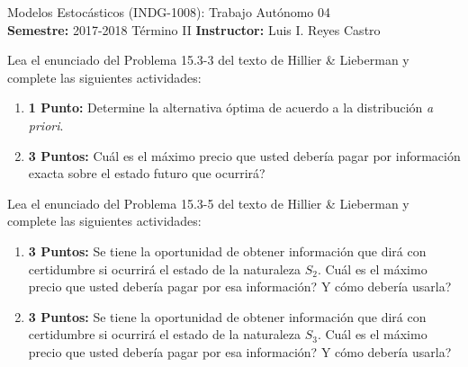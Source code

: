 \documentclass[ a4paper, twoside, 11pt]{article}
\newcommand{\numero}{04}
\begin{document}
\allowdisplaybreaks



\begin{center}
\Large Modelos Estoc\'asticos (INDG-1008): Trabajo Aut\'onomo \numero \\[1ex]
\small \textbf{Semestre:} 2017-2018 T\'ermino II \qquad
\textbf{Instructor:} Luis I. Reyes Castro
\end{center}
\fullskip

%
\halfskip

\begin{problem}
\label{prob:H&L_P15_3_3} Lea el enunciado del Problema 15.3-3 del texto de Hillier \& Lieberman y complete las siguientes actividades: 
\begin{enumerate}[label=\textbf{\alph*)}]
\item \textbf{1 Punto:} Determine la alternativa \'optima de acuerdo a la distribuci\'on \emph{a priori}. 
\item \textbf{3 Puntos:} Cu\'al es el m\'aximo precio que usted deber\'ia pagar por informaci\'on exacta sobre el estado futuro que ocurrir\'a?
\end{enumerate}

\end{problem}
\fullskip

\begin{problem}
\label{prob:H&L_P15_3_5} Lea el enunciado del Problema 15.3-5 del texto de Hillier \& Lieberman y complete las siguientes actividades: 
\begin{enumerate}[label=\textbf{\alph*)}]
\item \textbf{3 Puntos:} Se tiene la oportunidad de obtener informaci\'on que dir\'a con certidumbre si ocurrir\'a el estado de la naturaleza $S_2$. Cu\'al es el m\'aximo precio que usted deber\'ia pagar por esa informaci\'on? Y c\'omo deber\'ia usarla? 
\item \textbf{3 Puntos:} Se tiene la oportunidad de obtener informaci\'on que dir\'a con certidumbre si ocurrir\'a el estado de la naturaleza $S_3$. Cu\'al es el m\'aximo precio que usted deber\'ia pagar por esa informaci\'on? Y c\'omo deber\'ia usarla? 
\end{enumerate}


\end{problem}
\fullskip
\end{document}
